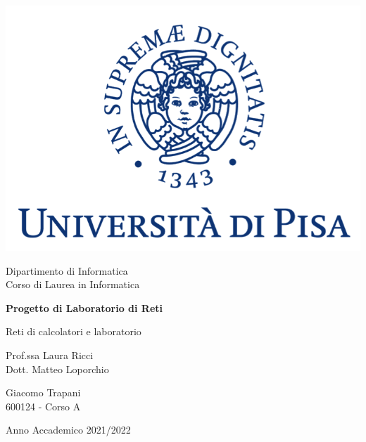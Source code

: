 \documentclass[11pt, italian, openany]{book}
\begin{document}
\begin{sloppypar}
\begin{titlepage}
	\clearpage\thispagestyle{empty}
	\centering
	\vspace{1cm}

    \includegraphics[scale=0.60]{images/unipi-logo.png}
    
	{\normalsize \noindent Dipartimento di Informatica \\
	             Corso di Laurea in Informatica \par}
	
	\vspace{2cm}
	{\Huge \textbf{Progetto di Laboratorio di Reti} \par}
	\vspace{1cm}
	{\large Reti di calcolatori e laboratorio}
	\vspace{5cm}

    \begin{minipage}[t]{0.47\textwidth}
    	{\large{ Prof.ssa Laura Ricci \\ Dott. Matteo Loporchio}}
    \end{minipage}\hfill\begin{minipage}[t]{0.47\textwidth}\raggedleft
    	{\large {Giacomo Trapani \\ 600124 - Corso A\\ }}
    \end{minipage}

    \vspace{4cm}

	{\normalsize Anno Accademico 2021/2022 \par}

	\pagebreak
\end{titlepage}


\end{sloppypar}
\end{document}
